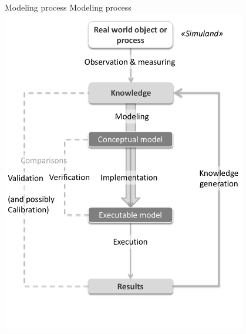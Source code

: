 
\createfigure%
{Modeling process}%
{Modeling process}%
{\label{fig:modeling}}%
{\includegraphics[width=0.8\textwidth, angle=0]{using/figures/modeling.pdf}}%
{}

